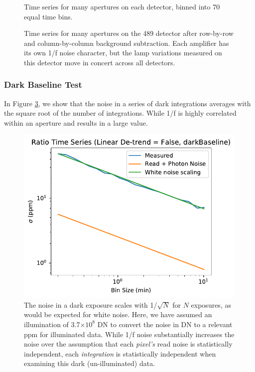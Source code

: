 \documentclass{aastex62}
\begin{document}
\begin{figure}
{}
{}
{}
\caption{Time series for many apertures on each detector, binned into 70 equal time bins.}\label{fig:manyApPerDetector}
\end{figure}

\begin{figure}
{}
{}
\caption{Time series for many apertures on the 489 detector after row-by-row and column-by-column background subtraction.
Each amplifier has its own 1/f noise character, but the lamp variations measured on this detector move in concert across all detectors.}\label{fig:manyApOn489}
\end{figure}



\clearpage
\subsubsection{Dark Baseline Test}\label{sec:darkBaseline}
In Figure \ref{fig:darkBaselineAllan}, we show that the noise in a series of dark integrations averages with the square root of the number of integrations.
While 1/f is highly correlated within an aperture and results in a large value.

\begin{figure}[!hbtp]
\centering
\includegraphics[width=.4\columnwidth]{allan_var_removelinear_False_darkBaseline.pdf}
\caption{The noise in a dark exposure scales with 1/$\sqrt{N}$ for $N$ exposures, as would be expected for white noise.
Here, we have assumed an illumination of 3.7$\times10^8$ DN to convert the noise in DN to a relevant ppm for illuminated data.
While 1/f noise substantially increases the noise over the assumption that each \textit{pixel's} read noise is statistically independent, each \textit{integration} is statistically independent when examining this dark (un-illuminated) data.
}\label{fig:darkBaselineAllan}
\end{figure}
\end{document}

